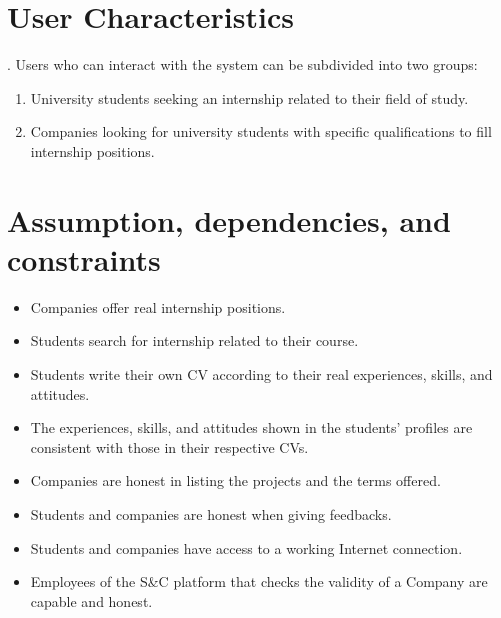\section{User Characteristics}. Users who can interact with the system can be subdivided into two groups:
\begin{enumerate}
    \item University students seeking an internship related to their field of study. 
    \item Companies looking for university students with specific qualifications to fill internship positions.
\end{enumerate}



\section{Assumption, dependencies, and constraints}
\begin{itemize}
    \item[\text{[D1]}] Companies offer real internship positions.
    \item[\text{[D2]}] Students search for internship related to their course.
    \item[\text{[D3]}] Students write their own CV according to their real experiences, skills, and attitudes.
    \item[\text{[D4]}] The experiences, skills, and attitudes shown in the students' profiles are consistent with those in their respective CVs.
    \item[\text{[D5]}] Companies are honest in listing the projects and the terms offered.
    \item[\text{[D6]}] Students and companies are honest when giving feedbacks.
    \item[\text{[D7]}] Students and companies have access to a working Internet connection.
    \item[\text{[D8]}] Employees of the S\&C platform that checks the validity of a Company are capable and honest.
\end{itemize}
